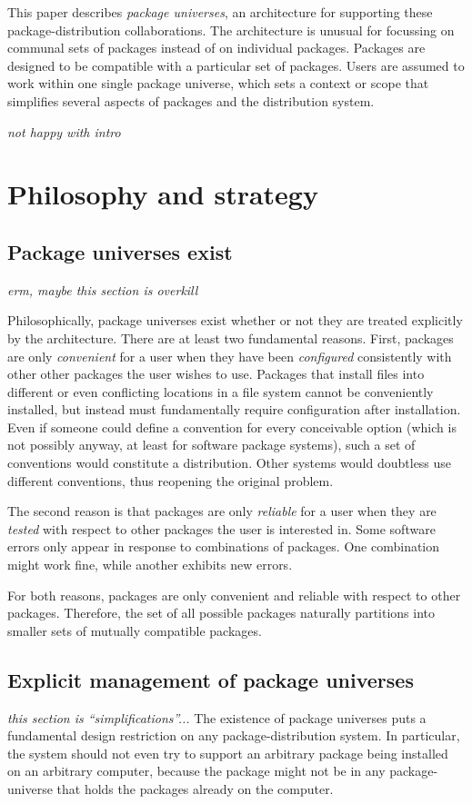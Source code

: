\documentclass{article}
\newcommand{\hole}[1]{\emph{#1}}
\begin{document}
This paper describes \emph{package universes}, an architecture for
supporting these package-distribution collaborations.  The
architecture is unusual for focussing on communal sets of packages
instead of on individual packages.  Packages are designed to be
compatible with a particular set of packages.  Users are assumed to
work within one single package universe, which sets a context or scope
that simplifies several aspects of packages and the distribution
system.


\hole{not happy with intro}

\section{Philosophy and strategy}

\subsection{Package universes exist}
\hole{erm, maybe this section is overkill}

Philosophically, package universes exist whether or not they are
treated explicitly by the architecture.  There are at least two
fundamental reasons.  First, packages are only \emph{convenient} for a
user when they have been \emph{configured} consistently with other
other packages the user wishes to use.  Packages that install files
into different or even conflicting locations in a file system cannot be
conveniently installed, but instead must fundamentally require
configuration after installation.  Even if someone could define a
convention for every conceivable option (which is not possibly anyway,
at least for software package systems), such a set of conventions
would constitute a distribution.  Other systems would doubtless use
different conventions, thus reopening the original problem.

The second reason is that packages are only \emph{reliable} for a user
when they are \emph{tested} with respect to other packages the user is
interested in.  Some software errors only appear in response to
combinations of packages.  One combination might work fine, while
another exhibits new errors.

For both reasons, packages are only convenient and reliable with
respect to other packages.  Therefore, the set of all possible
packages naturally partitions into smaller sets of mutually compatible
packages.


\subsection{Explicit management of package universes}
\hole{this section is ``simplifications''...}
The existence of package universes puts a fundamental design
restriction on any package-distribution system.  In particular, the
system should not even try to support an arbitrary package being
installed on an arbitrary computer, because the package might not be
in any package-universe that holds the packages already on the
computer.
\end{document}
